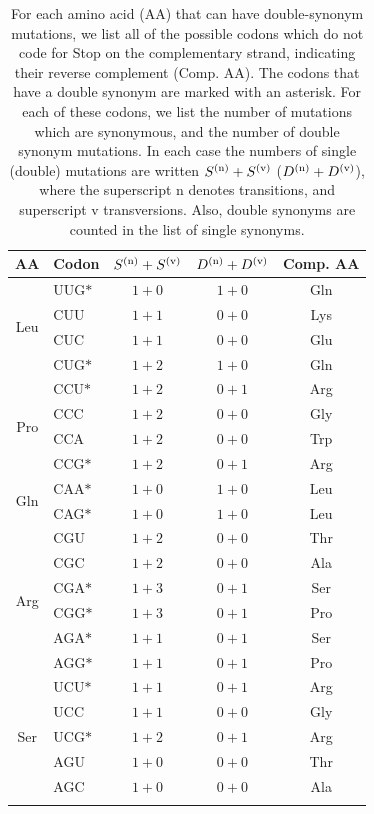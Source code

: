 \documentclass[unnumsec,webpdf,contemporary,large,namedate]{oup-authoring-template}%
\theoremstyle{thmstyleone}%
\theoremstyle{thmstyletwo}%
\theoremstyle{thmstylethree}%
\begin{document}
\begin{table}[t]
\caption{For each amino acid (AA) that can have double-synonym mutations, we list 
all of the possible codons which do not code for Stop on the complementary strand, indicating 
their reverse complement (Comp. AA). 
The codons that have a double synonym are marked with an asterisk. 
For each of these codons, we list the number of mutations which are synonymous, 
and the number of double synonym mutations. In each case the numbers of single (double) mutations are written 
$S^{({\rm n})}+S^{({\rm v})}$ ($D^{({\rm n})}+D^{({\rm v})}$), where the superscript n denotes transitions, 
and superscript v transversions. Also, double synonyms are counted in the list of single synonyms.
\label{tab: 1}}
\begin{tabular*}{\columnwidth}{@{\extracolsep\fill}clccc@{\extracolsep\fill}}
\toprule
AA&Codon&$S^{({\rm n})}+S^{({\rm v})}$&$D^{({\rm n})}+D^{({\rm v})}$&Comp. AA\\ 
\midrule
\multirow{4}{*}{Leu} &UUG$\ast$&$1+0$&$1+0$&Gln\\ 
       &CUU&$1+1$&$0+0$&Lys\\ 
       &CUC&$1+1$&$0+0$&Glu\\ 
       &CUG$\ast$&$1+2$&$1+0$&Gln\\  
\midrule
\multirow{4}{*}{Pro} &CCU$\ast$&$1+2$&$0+1$&Arg\\ 
       &CCC&$1+2$&$0+0$&Gly\\ 
       &CCA&$1+2$&$0+0$&Trp\\ 
       &CCG$\ast$&$1+2$&$0+1$&Arg\\  
\midrule
\multirow{2}{*}{Gln} &CAA$\ast$&$1+0$&$1+0$&Leu\\ 
       &CAG$\ast$&$1+0$&$1+0$&Leu\\ 
\midrule
\multirow{6}{*}{Arg} &CGU&$1+2$&$0+0$&Thr\\ 
       &CGC&$1+2$&$0+0$&Ala\\ 
       &CGA$\ast$&$1+3$&$0+1$&Ser\\ 
       &CGG$\ast$&$1+3$&$0+1$&Pro\\  
       &AGA$\ast$&$1+1$&$0+1$&Ser\\ 
       &AGG$\ast$&$1+1$&$0+1$&Pro\\ 
\midrule
\multirow{5}{*}{Ser} &UCU$\ast$&$1+1$&$0+1$&Arg\\ 
       &UCC&$1+1$&$0+0$&Gly\\ 
       &UCG$\ast$&$1+2$&$0+1$&Arg\\ 
       &AGU&$1+0$&$0+0$&Thr\\  
       &AGC&$1+0$&$0+0$&Ala\\ 
\botrule
\end{tabular*}
\end{table}
\end{document}
